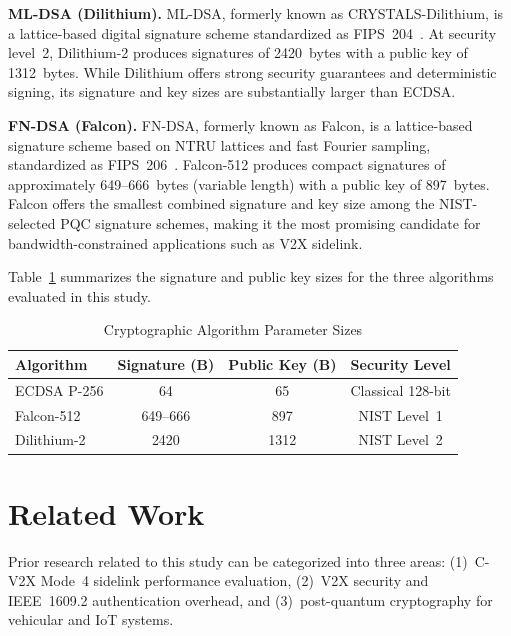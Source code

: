 \documentclass[letterpaper,journal]{IEEEtran}
\begin{document}
\textbf{ML-DSA (Dilithium).} ML-DSA, formerly known as CRYSTALS-Dilithium, is a lattice-based digital signature scheme standardized as FIPS~204~\cite{fips204}. At security level~2, Dilithium-2 produces signatures of 2420~bytes with a public key of 1312~bytes. While Dilithium offers strong security guarantees and deterministic signing, its signature and key sizes are substantially larger than ECDSA.

\textbf{FN-DSA (Falcon).} FN-DSA, formerly known as Falcon, is a lattice-based signature scheme based on NTRU lattices and fast Fourier sampling, standardized as FIPS~206~\cite{fips206}. Falcon-512 produces compact signatures of approximately 649--666~bytes (variable length) with a public key of 897~bytes. Falcon offers the smallest combined signature and key size among the NIST-selected PQC signature schemes, making it the most promising candidate for bandwidth-constrained applications such as V2X sidelink.

Table~\ref{tab:crypto_sizes} summarizes the signature and public key sizes for the three algorithms evaluated in this study.

\begin{table}[!htbp]
    \caption{Cryptographic Algorithm Parameter Sizes}
    \label{tab:crypto_sizes}
    \centering
    \begin{tabular}{lccc}
    \toprule
    \textbf{Algorithm} & \textbf{Signature (B)} & \textbf{Public Key (B)} & \textbf{Security Level} \\
    \midrule
    ECDSA P-256    & 64        & 65      & Classical 128-bit \\
    Falcon-512     & 649--666  & 897     & NIST Level~1 \\
    Dilithium-2    & 2420      & 1312    & NIST Level~2 \\
    \bottomrule
    \end{tabular}
\end{table}

\section{Related Work}
\label{sec:related}

Prior research related to this study can be categorized into three areas: (1)~C-V2X Mode~4 sidelink performance evaluation, (2)~V2X security and IEEE~1609.2 authentication overhead, and (3)~post-quantum cryptography for vehicular and IoT systems.
\end{document}
